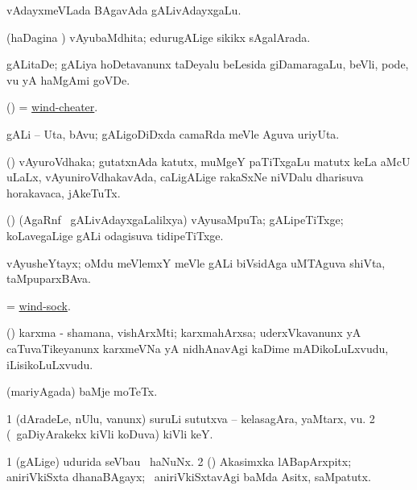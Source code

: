 \bentry
{}
\gl{\nA}
\bmng
vAdayxmeVLada BAgavAda gALivAdayxgaLu. 
\emng
\eentry

\bentry
{}
\gl{\gu}
\bmng
(haDagina \vi) vAyubaMdhita; edurugALige sikikx sAgalArada. 
\emng
\eentry

\bentry
{}
\gl{\nA}
\bmng
gALitaDe; gALiya hoDetavanunx taDeyalu beLesida giDamaragaLu, beVli, pode, \mo vu yA haMgAmi goVDe. 
\emng
\eentry

\bentry
{}
\gl{\nA}
\bmng
(\ame) = \hyperlink{wind-cheater}{wind-cheater}. 
\emng
\eentry

\bentry
{}
\gl{\nA}
\bmng
gALi -- Uta, bAvu; gALigoDiDxda camaRda meVle Aguva uriyUta. 
\emng
\eentry

\bentry
{}
\gl{\nA}
\bmng
(\birx) vAyuroVdhaka; gutatxnAda katutx, muMgeY paTiTxgaLu matutx keLa aMcU uLaLx, vAyuniroVdhakavAda, caLigALige rakaSxNe niVDalu dharisuva horakavaca, jAkeTuTx. 
\emng
\eentry

\bentry
{}
\gl{\nA}
\bmng
(\saM) (AgaRnf \mo\ gALivAdayxgaLalilxya) vAyusaMpuTa; gALipeTiTxge; koLavegaLige gALi odagisuva tidipeTiTxge. 
\emng
\eentry

\bentry
{}
\gl{\nA}
\bmng
vAyusheYtayx; oMdu meVlemxY meVle gALi biVsidAga uMTAguva shiVta, taMpuparxBAva. 
\emng
\eentry

\bentry
{}
\gl{\nA}
\bmng
= \hyperlink{wind-sock}{wind-sock}. 
\emng
\eentry

\bentry
{}
\gl{\nA}
\bmng
(\AmA) karxma - shamana, vishArxMti; karxmahArxsa; uderxVkavanunx yA caTuvaTikeyanunx karxmeVNa yA nidhAnavAgi kaDime mADikoLuLxvudu, iLisikoLuLxvudu. 
\emng
\eentry

\bentry
{}
\gl{\nA}
\bmng
(mariyAgada) baMje moTeTx. 
\emng
\eentry

\bentry
{}
\gl{\nA}
\bmng
\bnum
\num{1} (dAradeLe, nUlu, \mo vanunx) suruLi sututxva -- kelasagAra, yaMtarx, \mo vu. 
\num{2} (\kanmu\ gaDiyArakekx kiVli koDuva) kiVli keY. 
\enum
\emng
\eentry

\bentry
{}
\gl{\nA}
\bmng
\bnum
\num{1} (gALige) udurida seVbau \mo\ haNuNx. 
\num{2} (\rUpa) Akasimxka lABapArxpitx; aniriVkiSxta dhanaBAgayx; \kanmu\ aniriVkiSxtavAgi baMda Asitx, saMpatutx. 
\enum
\emng
\eentry

